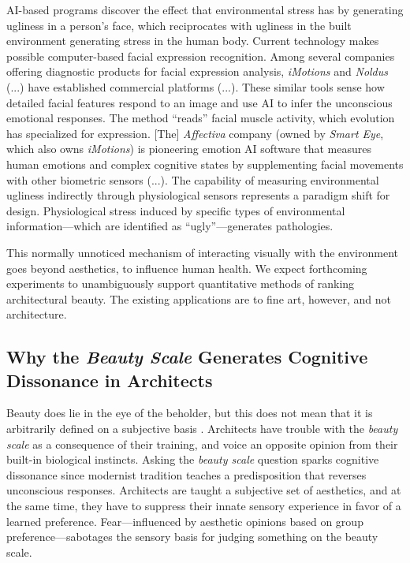 \documentclass[a4paper]{article}
\begin{document}
AI-based programs discover the effect that environmental stress has by generating ugliness in a person’s face, which reciprocates with ugliness in the built environment generating stress in the human body. Current technology makes possible computer-based facial expression recognition. Among several companies offering diagnostic products for facial expression analysis, \textit{iMotions} and \textit{Noldus} (...) have established commercial platforms (...). These similar tools sense how detailed facial features respond to an image and use AI to infer the unconscious emotional responses. The method “reads” facial muscle activity, which evolution has specialized for expression. [The] \textit{Affectiva} company (owned by \textit{Smart Eye}, which also owns \textit{iMotions}) is pioneering emotion AI software that measures human emotions and complex cognitive states by supplementing facial movements with other biometric sensors (...). The capability of measuring environmental ugliness indirectly through physiological sensors represents a paradigm shift for design. Physiological stress induced by specific types of environmental information—which are identified as “ugly”—generates pathologies.

This normally unnoticed mechanism of interacting visually with the environment goes beyond aesthetics, to influence human health. We expect forthcoming experiments to unambiguously support quantitative methods of ranking architectural beauty. The existing applications are to fine art, however, and not architecture.

\subsection{Why the \textit{Beauty Scale} Generates Cognitive Dissonance in Architects}

Beauty does lie in the eye of the beholder, but this does not mean that it is arbitrarily defined on a subjective basis \cite{norman_introduction_2004}. Architects have trouble with the \textit{beauty scale} as a consequence of their training, and voice an opposite opinion from their built-in biological instincts. Asking the \textit{beauty scale} question sparks cognitive dissonance since modernist tradition teaches a predisposition that reverses unconscious responses. Architects are taught a subjective set of aesthetics, and at the same time, they have to suppress their innate sensory experience in favor of a learned preference. Fear—influenced by aesthetic opinions based on group preference—sabotages the sensory basis for judging something on the beauty scale.
\end{document}
